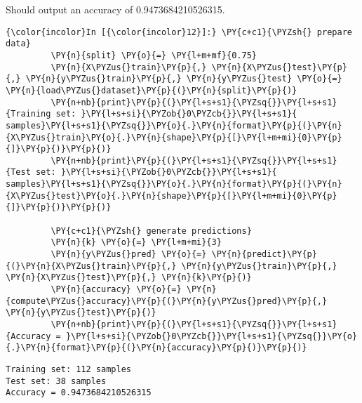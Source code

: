 Should output an accuracy of 0.9473684210526315.

    \begin{Verbatim}[commandchars=\\\{\}]
{\color{incolor}In [{\color{incolor}12}]:} \PY{c+c1}{\PYZsh{} prepare data}
         \PY{n}{split} \PY{o}{=} \PY{l+m+mf}{0.75}
         \PY{n}{X\PYZus{}train}\PY{p}{,} \PY{n}{X\PYZus{}test}\PY{p}{,} \PY{n}{y\PYZus{}train}\PY{p}{,} \PY{n}{y\PYZus{}test} \PY{o}{=} \PY{n}{load\PYZus{}dataset}\PY{p}{(}\PY{n}{split}\PY{p}{)}
         \PY{n+nb}{print}\PY{p}{(}\PY{l+s+s1}{\PYZsq{}}\PY{l+s+s1}{Training set: }\PY{l+s+si}{\PYZob{}0\PYZcb{}}\PY{l+s+s1}{ samples}\PY{l+s+s1}{\PYZsq{}}\PY{o}{.}\PY{n}{format}\PY{p}{(}\PY{n}{X\PYZus{}train}\PY{o}{.}\PY{n}{shape}\PY{p}{[}\PY{l+m+mi}{0}\PY{p}{]}\PY{p}{)}\PY{p}{)}
         \PY{n+nb}{print}\PY{p}{(}\PY{l+s+s1}{\PYZsq{}}\PY{l+s+s1}{Test set: }\PY{l+s+si}{\PYZob{}0\PYZcb{}}\PY{l+s+s1}{ samples}\PY{l+s+s1}{\PYZsq{}}\PY{o}{.}\PY{n}{format}\PY{p}{(}\PY{n}{X\PYZus{}test}\PY{o}{.}\PY{n}{shape}\PY{p}{[}\PY{l+m+mi}{0}\PY{p}{]}\PY{p}{)}\PY{p}{)}
         
         \PY{c+c1}{\PYZsh{} generate predictions}
         \PY{n}{k} \PY{o}{=} \PY{l+m+mi}{3}
         \PY{n}{y\PYZus{}pred} \PY{o}{=} \PY{n}{predict}\PY{p}{(}\PY{n}{X\PYZus{}train}\PY{p}{,} \PY{n}{y\PYZus{}train}\PY{p}{,} \PY{n}{X\PYZus{}test}\PY{p}{,} \PY{n}{k}\PY{p}{)}
         \PY{n}{accuracy} \PY{o}{=} \PY{n}{compute\PYZus{}accuracy}\PY{p}{(}\PY{n}{y\PYZus{}pred}\PY{p}{,} \PY{n}{y\PYZus{}test}\PY{p}{)}
         \PY{n+nb}{print}\PY{p}{(}\PY{l+s+s1}{\PYZsq{}}\PY{l+s+s1}{Accuracy = }\PY{l+s+si}{\PYZob{}0\PYZcb{}}\PY{l+s+s1}{\PYZsq{}}\PY{o}{.}\PY{n}{format}\PY{p}{(}\PY{n}{accuracy}\PY{p}{)}\PY{p}{)}
\end{Verbatim}

    \begin{Verbatim}[commandchars=\\\{\}]
Training set: 112 samples
Test set: 38 samples
Accuracy = 0.9473684210526315

    \end{Verbatim}

